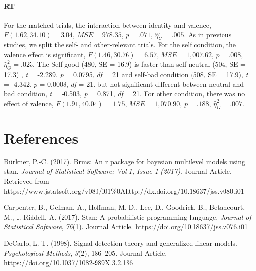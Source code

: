 \documentclass[
  english,
  man]{apa6}
\let\oldparagraph\paragraph
\renewcommand{\paragraph}[1]{\oldparagraph{#1}\mbox{}}
\begin{document}
\hypertarget{rt-1}{%
\paragraph{RT}\label{rt-1}}

For the matched trials, the interaction between identity and valence, \(F(1.62, 34.10) = 3.04\), \(\mathit{MSE} = 978.35\), \(p = .071\), \(\hat{\eta}^2_G = .005\). As in previous studies, we split the self- and other-relevant trials. For the self condition, the valence effect is significant, \(F(1.46, 30.76) = 6.57\), \(\mathit{MSE} = 1,007.62\), \(p = .008\), \(\hat{\eta}^2_G = .023\). The Self-good (480, SE = 16.9) is faster than self-neutral (504, SE = 17.3) , \emph{t} = -2.289, \emph{p} = 0.0795, \emph{df} = 21 and self-bad condition (508, SE = 17.9), \emph{t} = -4.342, \emph{p} = 0.0008, \emph{df} = 21. but not significant different between neutral and bad condition, \emph{t} = -0.503, \emph{p} = 0.871, \emph{df} = 21. For other condition, there was no effect of valence, \(F(1.91, 40.04) = 1.75\), \(\mathit{MSE} = 1,070.90\), \(p = .188\), \(\hat{\eta}^2_G = .007\).

\newpage

\hypertarget{references}{%
\section{References}\label{references}}

\begingroup
\setlength{\parindent}{-0.5in}
\setlength{\leftskip}{0.5in}

\hypertarget{refs}{}
\leavevmode\hypertarget{ref-Buxfcrkner_2017}{}%
Bürkner, P.-C. (2017). Brms: An r package for bayesian multilevel models using stan. \emph{Journal of Statistical Software; Vol 1, Issue 1 (2017)}. Journal Article. Retrieved from \url{https://www.jstatsoft.org/v080/i01\%0Ahttp://dx.doi.org/10.18637/jss.v080.i01}

\leavevmode\hypertarget{ref-Carpenter_2017_stan}{}%
Carpenter, B., Gelman, A., Hoffman, M. D., Lee, D., Goodrich, B., Betancourt, M., \ldots{} Riddell, A. (2017). Stan: A probabilistic programming language. \emph{Journal of Statistical Software}, \emph{76}(1). Journal Article. \url{https://doi.org/10.18637/jss.v076.i01}

\leavevmode\hypertarget{ref-DeCarlo_1998}{}%
DeCarlo, L. T. (1998). Signal detection theory and generalized linear models. \emph{Psychological Methods}, \emph{3}(2), 186--205. Journal Article. \url{https://doi.org/10.1037/1082-989X.3.2.186}
\end{document}
